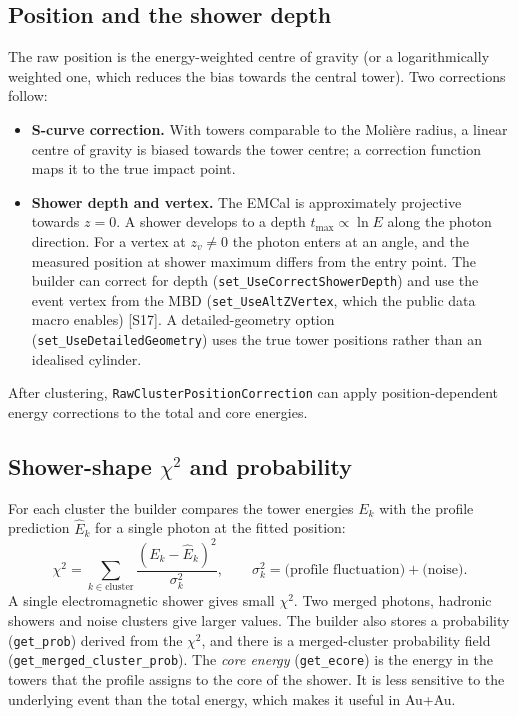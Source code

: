 \documentclass[11pt,letterpaper]{article}
\begin{document}
\subsection{Position and the shower depth}
The raw position is the energy-weighted centre of gravity (or a logarithmically weighted one, which reduces the bias towards the central tower).
Two corrections follow:
\begin{itemize}
\item \textbf{S-curve correction.} With towers comparable to the Moli\`ere radius, a linear centre of gravity is biased towards the tower centre; a correction function maps it to the true impact point.
\item \textbf{Shower depth and vertex.} The EMCal is approximately projective towards $z=0$. A shower develops to a depth $t_{\max}\propto\ln E$ along the photon direction.
For a vertex at $z_v\neq0$ the photon enters at an angle, and the measured position at shower maximum differs from the entry point. The builder can correct for depth (\texttt{set\_UseCorrectShowerDepth}) and use the event vertex from the MBD (\texttt{set\_UseAltZVertex}, which the public data macro enables) [S17].
A detailed-geometry option (\texttt{set\_UseDetailedGeometry}) uses the true tower positions rather than an idealised cylinder.
\end{itemize}
After clustering, \texttt{RawClusterPositionCorrection} can apply position-dependent energy corrections to the total and core energies.

\subsection{Shower-shape $\chi^2$ and probability}
For each cluster the builder compares the tower energies $E_k$ with the profile prediction $\hat E_k$ for a single photon at the fitted position:
\begin{equation}
\chi^2 = \sum_{k\in\mathrm{cluster}}\frac{(E_k-\hat E_k)^2}{\sigma_k^2},\qquad \sigma_k^2 = \text{(profile fluctuation)} + \text{(noise)}.
\end{equation}
A single electromagnetic shower gives small $\chi^2$. Two merged photons, hadronic showers and noise clusters give larger values.
The builder also stores a probability (\texttt{get\_prob}) derived from the $\chi^2$, and there is a merged-cluster probability field (\texttt{get\_merged\_cluster\_prob}).
The \emph{core energy} (\texttt{get\_ecore}) is the energy in the towers that the profile assigns to the core of the shower. It is less sensitive to the underlying event than the total energy,
which makes it useful in Au+Au.
\end{document}
